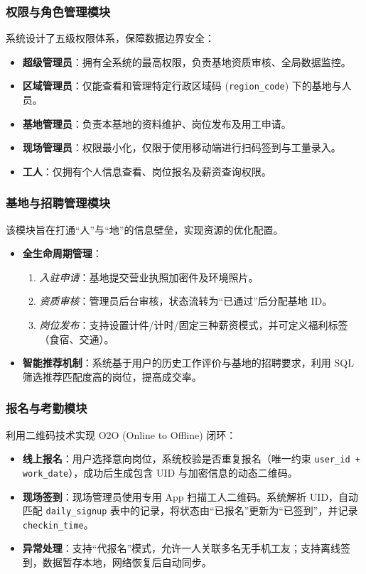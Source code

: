 \documentclass[UTF8,a4paper,12pt]{article}
\begin{document}
\subsubsection{权限与角色管理模块}
系统设计了五级权限体系，保障数据边界安全：
\begin{itemize}
    \item \textbf{超级管理员}：拥有全系统的最高权限，负责基地资质审核、全局数据监控。
    \item \textbf{区域管理员}：仅能查看和管理特定行政区域码 (\texttt{region\_code}) 下的基地与人员。
    \item \textbf{基地管理员}：负责本基地的资料维护、岗位发布及用工申请。
    \item \textbf{现场管理员}：权限最小化，仅限于使用移动端进行扫码签到与工量录入。
    \item \textbf{工人}：仅拥有个人信息查看、岗位报名及薪资查询权限。
\end{itemize}

\subsubsection{基地与招聘管理模块}
该模块旨在打通“人”与“地”的信息壁垒，实现资源的优化配置。
\begin{itemize}
    \item \textbf{全生命周期管理}：
    \begin{enumerate}
        \item \textit{入驻申请}：基地提交营业执照加密件及环境照片。
        \item \textit{资质审核}：管理员后台审核，状态流转为“已通过”后分配基地 ID。
        \item \textit{岗位发布}：支持设置计件/计时/固定三种薪资模式，并可定义福利标签（食宿、交通）。
    \end{enumerate}
    \item \textbf{智能推荐机制}：系统基于用户的历史工作评价与基地的招聘要求，利用 SQL 筛选推荐匹配度高的岗位，提高成交率。
\end{itemize}

\subsubsection{报名与考勤模块}
利用二维码技术实现 O2O (Online to Offline) 闭环：
\begin{itemize}
    \item \textbf{线上报名}：用户选择意向岗位，系统校验是否重复报名（唯一约束 \texttt{user\_id + work\_date}），成功后生成包含 UID 与加密信息的动态二维码。
    \item \textbf{现场签到}：现场管理员使用专用 App 扫描工人二维码。系统解析 UID，自动匹配 \texttt{daily\_signup} 表中的记录，将状态由“已报名”更新为“已签到”，并记录 \texttt{checkin\_time}。
    \item \textbf{异常处理}：支持“代报名”模式，允许一人关联多名无手机工友；支持离线签到，数据暂存本地，网络恢复后自动同步。
\end{itemize}
\end{document}
